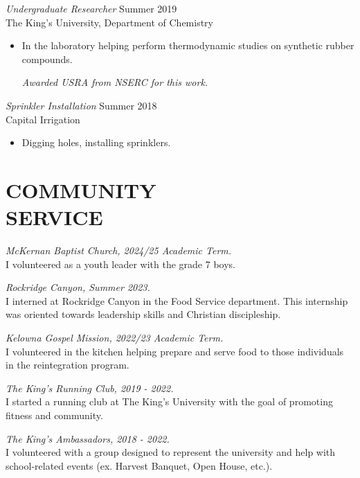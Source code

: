 \documentclass[margin, 10pt]{res} %
\begin{document}
\begin{resume}
{\sl Undergraduate Researcher} \hfill Summer 2019 \\
The King's University, Department of Chemistry
\begin{itemize}
\item In the laboratory helping perform thermodynamic studies on synthetic rubber compounds.
\par
\small{\textit{Awarded USRA from NSERC for this work.}} %
\end{itemize}

{\sl Sprinkler Installation} \hfill Summer 2018 \\
Capital Irrigation
\begin{itemize}
\item Digging holes, installing sprinklers.
\end{itemize}



\section{COMMUNITY \\ SERVICE}


{\it McKernan Baptist Church, 2024/25 Academic Term.} \\
I volunteered as a youth leader with the grade 7 boys.  


{\it Rockridge Canyon, Summer 2023.} \\
I interned at Rockridge Canyon in the Food Service department. This internship was oriented towards leadership skills and Christian discipleship. 


{\it Kelowna Gospel Mission, 2022/23 Academic Term.} \\
I volunteered in the kitchen helping prepare and serve food to those individuals in the reintegration program. 


{\it The King's Running Club, 2019 - 2022.} \\
I started a running club at The King's University with the goal of promoting fitness and community.


{\it The King's Ambassadors, 2018 - 2022.} \\
I volunteered with a group designed to represent the university and help with school-related events (ex. Harvest Banquet, Open House, etc.).


\end{resume}
\end{document}
